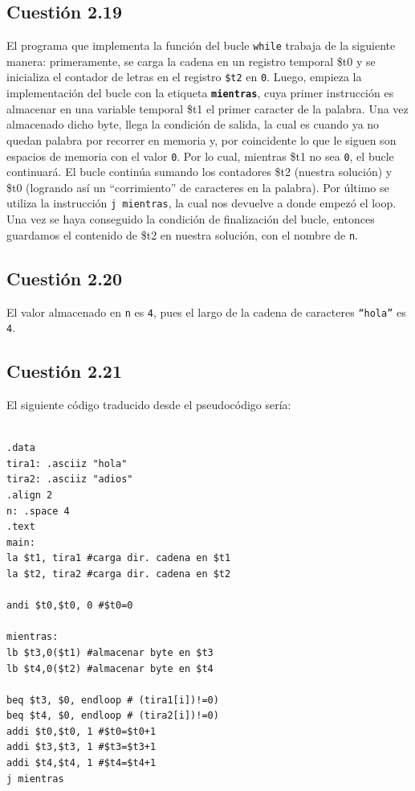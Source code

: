 \documentclass[11pt]{article}
\begin{document}
\begin{large}
\begin{flushleft}
\subsection*{Cuestión 2.19}
El programa que implementa la función del bucle \texttt{while} trabaja de la siguiente manera: primeramente, se carga la cadena en un registro temporal \$t0 y se inicializa el contador de letras en el registro \texttt{\$t2} en \texttt{0}. Luego, empieza la implementación del bucle con la etiqueta \textbf{\texttt{mientras}}, cuya primer instrucción es almacenar en una variable temporal \$t1 el primer caracter de la palabra. Una vez almacenado dicho byte, llega la condición de salida, la cual es cuando ya no quedan palabra por recorrer en memoria y, por coincidente lo que le siguen son espacios de memoria con el valor \texttt{0}. Por lo cual, mientras \$t1 no sea \texttt{0}, el bucle continuará. El bucle continúa sumando los contadores \$t2 (nuestra solución) y \$t0 (logrando así un ``corrimiento'' de caracteres en la palabra). Por último se utiliza la instrucción \texttt{j mientras}, la cual nos devuelve a donde empezó el loop. Una vez se haya conseguido la condición de finalización del bucle, entonces guardamos el contenido de \$t2 en nuestra solución, con el nombre de \texttt{n}.

\subsection*{Cuestión 2.20}
El valor almacenado en \texttt{n} es \texttt{4}, pues el largo de la cadena de caracteres \texttt{``hola''} es \texttt{4}.

\subsection*{Cuestión 2.21}
El siguiente código traducido desde el pseudocódigo sería:
\begin{listing}[h]
\begin{verbatim}

.data
tira1: .asciiz "hola"
tira2: .asciiz "adios"
.align 2
n: .space 4
.text
main: 
la $t1, tira1 #carga dir. cadena en $t1
la $t2, tira2 #carga dir. cadena en $t2

andi $t0,$t0, 0 #$t0=0

mientras: 
lb $t3,0($t1) #almacenar byte en $t3
lb $t4,0($t2) #almacenar byte en $t4

beq $t3, $0, endloop # (tira1[i])!=0)
beq $t4, $0, endloop # (tira2[i])!=0)
addi $t0,$t0, 1 #$t0=$t0+1
addi $t3,$t3, 1 #$t3=$t3+1
addi $t4,$t4, 1 #$t4=$t4+1
j mientras 


\end{verbatim}
\end{listing}
\end{flushleft}
\end{large}
\end{document}
